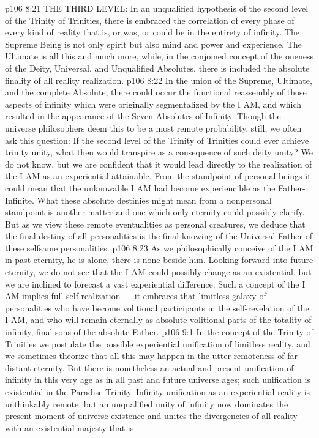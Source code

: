 \vs p106 8:21 THE THIRD LEVEL: In an unqualified hypothesis of the second level of the Trinity of Trinities, there is embraced the correlation of every phase of every kind of reality that is, or was, or could be in the entirety of infinity. The Supreme Being is not only spirit but also mind and power and experience. The Ultimate is all this and much more, while, in the conjoined concept of the oneness of the Deity, Universal, and Unqualified Absolutes, there is included the absolute finality of all reality realization.
\vs p106 8:22 In the union of the Supreme, Ultimate, and the complete Absolute, there could occur the functional reassembly of those aspects of infinity which were originally segmentalized by the I AM, and which resulted in the appearance of the Seven Absolutes of Infinity. Though the universe philosophers deem this to be a most remote probability, still, we often ask this question: If the second level of the Trinity of Trinities could ever achieve trinity unity, what then would transpire as a consequence of such deity unity? We do not know, but we are confident that it would lead directly to the realization of the I AM as an experiential attainable. From the standpoint of personal beings it could mean that the unknowable I AM had become experiencible as the Father\hyp{}Infinite. What these absolute destinies might mean from a nonpersonal standpoint is another matter and one which only eternity could possibly clarify. But as we view these remote eventualities as personal creatures, we deduce that the final destiny of all personalities is the final knowing of the Universal Father of these selfsame personalities.
\vs p106 8:23 As we philosophically conceive of the I AM in past eternity, he is alone, there is none beside him. Looking forward into future eternity, we do not see that the I AM could possibly change as an existential, but we are inclined to forecast a vast experiential difference. Such a concept of the I AM implies full self\hyp{}realization --- it embraces that limitless galaxy of personalities who have become volitional participants in the self\hyp{}revelation of the I AM, and who will remain eternally as absolute volitional parts of the totality of infinity, final sons of the absolute Father.
\vs p106 9:1 In the concept of the Trinity of Trinities we postulate the possible experiential unification of limitless reality, and we sometimes theorize that all this may happen in the utter remoteness of far\hyp{}distant eternity. But there is nonetheless an actual and present unification of infinity in this very age as in all past and future universe ages; such unification is existential in the Paradise Trinity. Infinity unification as an experiential reality is unthinkably remote, but an unqualified unity of infinity now dominates the present moment of universe existence and unites the divergencies of all reality with an existential majesty that is 
